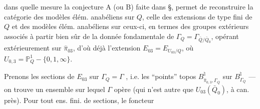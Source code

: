 dans quelle mesure la conjecture A
(ou B) faite dans  §, permet de
reconstruire la catégorie des modèles élém.
anabéliens sur $Q$,  celle des extensions
de type fini de $Q$ et des modèles
élém. anabéliens sur ceux-ci, en
termes des groupes extérieurs  associés
à partir bien sûr de la donnée
fondamentale de $\Gamma_Q=\Gamma_{\bar Q/\bar Q_0}$, opérant
extérieurement sur $\widehat\pi_{03}$, d'où déjà
l'extension $E_{03}=E_{U_{03}/Q}$, où
$U_{0,3}=\mathbb P^1_Q-\{0,1,\infty\}$.

Prenons les  sections de $E_{03}$ sur $\Gamma_Q=\Gamma$
,
i.e. les ``points''   topos $B_{\widehat\pi_{0,3},\Gamma_Q}^{\natural}$ sur
$B_{\Gamma_Q}^{\natural}$ — on trouve un ensemble sur
lequel $\Gamma$ opère (qui n'est autre que
$U_{03}(\bar Q_0)$, à  can. près). Pour
tout ens. fini.  de sections,  le foncteur
